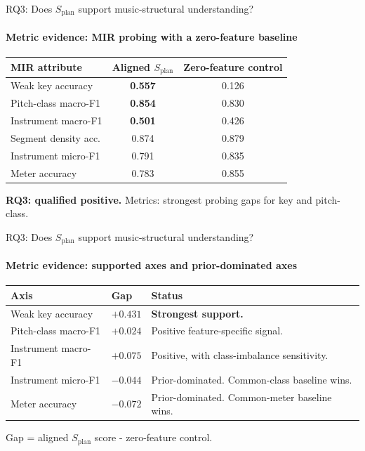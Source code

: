 \documentclass[aspectratio=169,11pt]{beamer}
\newcommand{\splan}{$S_{\mathrm{plan}}$}
\newcommand{\pos}[1]{{\bfseries\color{Green}#1}}
\newcommand{\bad}[1]{{\color{Red}#1}}
\renewcommand{\arraystretch}{1.18}
\begin{document}
\begin{frame}{RQ3: Does \splan{} support music-structural understanding?}
  \framesubtitle{Metric evidence: MIR probing with a zero-feature baseline}

  {\small
  \begin{tabular}{p{4.0cm}cc}
    \toprule
    \textbf{MIR attribute} & \textbf{Aligned \splan{}} & \textbf{Zero-feature control} \\
    \midrule
    Weak key accuracy     & \pos{0.557} & 0.126 \\
    Pitch-class macro-F1  & \pos{0.854} & 0.830 \\
    Instrument macro-F1   & \pos{0.501} & 0.426 \\
    Segment density acc.  & 0.874       & 0.879 \\
    \midrule
    Instrument micro-F1   & 0.791 & \bad{0.835} \\
    Meter accuracy        & 0.783 & \bad{0.855} \\
    \bottomrule
  \end{tabular}}

  \smallskip
  \begin{tcolorbox}[key]
    \textbf{RQ3: qualified positive.} Metrics: strongest probing gaps for key and pitch-class.
  \end{tcolorbox}
\end{frame}

\begin{frame}{RQ3: Does \splan{} support music-structural understanding?}
  \framesubtitle{Metric evidence: supported axes and prior-dominated axes}

  {\footnotesize\renewcommand{\arraystretch}{0.88}
  \begin{tabular}{p{3.0cm}p{2.2cm}p{6.5cm}}
    \toprule
    \textbf{Axis} & \textbf{Gap} & \textbf{Status} \\
    \midrule
    Weak key accuracy     & $+0.431$ & \pos{Strongest support.} \\
    Pitch-class macro-F1  & $+0.024$ & Positive feature-specific signal. \\
    Instrument macro-F1   & $+0.075$ & Positive, with class-imbalance sensitivity. \\
    \midrule
    Instrument micro-F1   & $-0.044$ & \bad{Prior-dominated.} Common-class baseline wins. \\
    Meter accuracy        & $-0.072$ & \bad{Prior-dominated.} Common-meter baseline wins. \\
    \bottomrule
  \end{tabular}}

  \vspace{4pt}
  {\footnotesize\color{Muted} Gap = aligned \splan{} score - zero-feature control.}
\end{frame}
\end{document}
